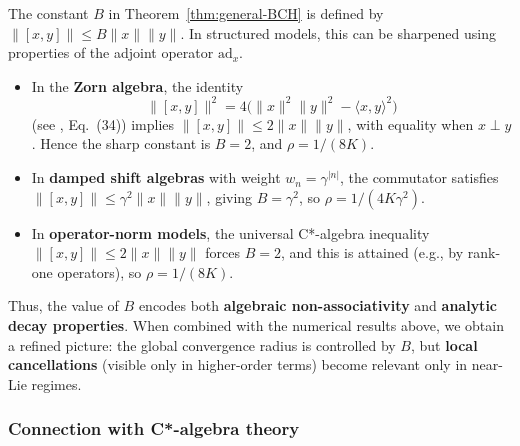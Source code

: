 \documentclass[11pt]{amsart}
\numberwithin{equation}{section}
\theoremstyle{remark}
\begin{document}
The constant $B$ in Theorem~\ref{thm:general-BCH} is defined by $\|[x,y]\| \leq B\|x\|\|y\|$. In structured models, this can be sharpened using properties of the adjoint operator $\mathrm{ad}_x$.\begin{itemize}
\item In the \textbf{Zorn algebra}, the identity
  \[
  \|[x,y]\|^2 = 4\big(\|x\|^2\|y\|^2 - \langle x, y \rangle^2\big)
  \]
  (see \cite{Baez2002}, Eq.~(34)) implies $\|[x,y]\| \leq 2\|x\|\|y\|$, with equality when $x \perp y$. Hence the sharp constant is $B = 2$, and $\rho = 1/(8K)$.

  \item In \textbf{damped shift algebras} with weight $w_n = \gamma^{|n|}$, the commutator satisfies $\|[x,y]\| \leq \gamma^2 \|x\| \|y\|$, giving $B = \gamma^2$, so $\rho = 1/(4K\gamma^2)$.

  \item In \textbf{operator-norm models}, the universal C*-algebra inequality $\|[x,y]\| \leq 2\|x\|\|y\|$ forces $B = 2$, and this is attained (e.g., by rank-one operators), so $\rho = 1/(8K)$.\end{itemize}
Thus, the value of $B$ encodes both \textbf{algebraic non-associativity} and \textbf{analytic decay properties}. When combined with the numerical results above, we obtain a refined picture: the global convergence radius is controlled by $B$, but \textbf{local cancellations} (visible only in higher-order terms) become relevant only in near-Lie regimes.

\subsubsection{Connection with C*-algebra theory}
\end{document}
